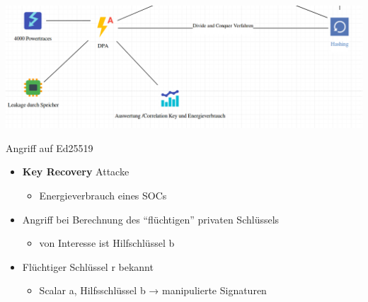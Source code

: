 \begin{frame}{}
\protect\hypertarget{section-22}{}
\includegraphics{Abbildungen/Punkt4.png}
\end{frame}

\begin{frame}{Angriff auf Ed25519}
\protect\hypertarget{angriff-auf-ed25519}{}
\begin{itemize}
\tightlist
\item
  \textbf{Key Recovery} Attacke

  \begin{itemize}
  \tightlist
  \item
    Energieverbrauch eines SOCs
  \end{itemize}
\end{itemize}

\pause

\begin{itemize}
\tightlist
\item
  Angriff bei Berechnung des ``flüchtigen'' privaten Schlüssels

  \begin{itemize}
  \tightlist
  \item
    von Interesse ist Hilfschlüssel b
  \end{itemize}
\end{itemize}

\pause

\begin{itemize}
\tightlist
\item
  Flüchtiger Schlüssel r bekannt

  \begin{itemize}
  \tightlist
  \item
    Scalar a, Hilfsschlüssel b → manipulierte Signaturen
  \end{itemize}
\end{itemize}
\end{frame}

